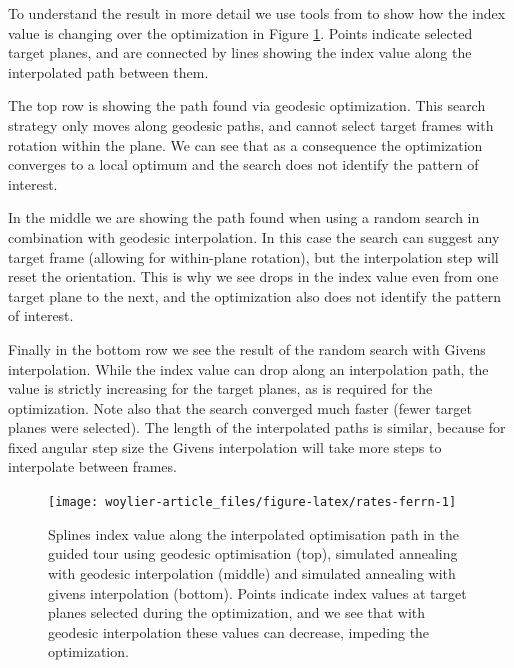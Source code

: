 To understand the result in more detail we use tools from
 \citep{ferrn} to show how the index value is changing
over the optimization in Figure \ref{fig:rates-ferrn}. Points indicate
selected target planes, and are connected by lines showing the index
value along the interpolated path between them.

The top row is showing the path found via geodesic optimization. This
search strategy only moves along geodesic paths, and cannot select
target frames with rotation within the plane. We can see that as a
consequence the optimization converges to a local optimum and the search
does not identify the pattern of interest.

In the middle we are showing the path found when using a random search
in combination with geodesic interpolation. In this case the search can
suggest any target frame (allowing for within-plane rotation), but the
interpolation step will reset the orientation. This is why we see drops
in the index value even from one target plane to the next, and the
optimization also does not identify the pattern of interest.

Finally in the bottom row we see the result of the random search with
Givens interpolation. While the index value can drop along an
interpolation path, the value is strictly increasing for the target
planes, as is required for the optimization. Note also that the search
converged much faster (fewer target planes were selected). The length of
the interpolated paths is similar, because for fixed angular step size
the Givens interpolation will take more steps to interpolate between
frames.

\begin{Schunk}
\begin{figure}
\texttt{[image: woylier-article\_files/figure-latex/rates-ferrn-1]} \caption[Splines index value along the interpolated optimisation path in the guided tour using geodesic optimisation (top), simulated annealing with geodesic interpolation (middle) and simulated annealing with givens interpolation (bottom)]{Splines index value along the interpolated optimisation path in the guided tour using geodesic optimisation (top), simulated annealing with geodesic interpolation (middle) and simulated annealing with givens interpolation (bottom). Points indicate index values at target planes selected during the optimization, and we see that with geodesic interpolation these values can decrease, impeding the optimization.}\label{fig:rates-ferrn}
\end{figure}
\end{Schunk}

